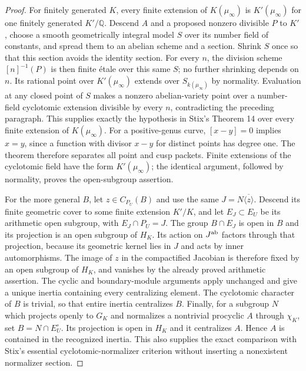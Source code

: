 \begin{proof}
For finitely generated $K$, every finite extension of $K(\mu_\infty)$
is $K'(\mu_\infty)$ for one finitely generated $K'/\mathbb Q$.
Descend $A$ and a proposed nonzero divisible $P$ to $K'$, choose
a smooth geometrically integral model $S$ over its number field of
constants, and spread them to an abelian scheme and a section.
Shrink $S$ once so that this section avoids the identity section.
For every $n$, the division scheme $[n]^{-1}(P)$ is then finite
\'etale over this same $S$; no further shrinking depends on $n$.
Its rational point over $K'(\mu_\infty)$ extends over
$S_{k(\mu_\infty)}$ by normality. Evaluation at any closed point
of $S$ makes a nonzero abelian-variety point over a number-field
cyclotomic extension divisible by every $n$, contradicting the
preceding paragraph. This supplies exactly the hypothesis in
Stix's Theorem 14 over every finite extension of $K(\mu_\infty)$.
For a positive-genus curve, $[x-y]=0$ implies $x=y$, since a
function with divisor $x-y$ for distinct points has degree one.
The theorem therefore separates all point and cusp
packets. Finite extensions of the cyclotomic field have the form
$K'(\mu_\infty)$; the identical argument, followed by normality,
proves the open-subgroup assertion.

For the more general $B$, let $z\in C_{P_U}(B)$ and use the same
$J=N\overline{\langle z\rangle}$. Descend its finite geometric
cover to some finite extension $K'/K$, and let $E_J\subset E_U$
be its arithmetic open subgroup, with $E_J\cap P_U=J$.
The group $B\cap E_J$ is open in $B$ and its projection is an
open subgroup of $H_K$. Its action on $J^{\rm ab}$ factors through
that projection, because its geometric kernel lies in $J$ and
acts by inner automorphisms. The image of $z$ in the compactified
Jacobian is therefore fixed by an open subgroup of $H_K$, and
vanishes by the already proved arithmetic assertion. The cyclic
and boundary-module arguments apply unchanged and give a unique
inertia containing every centralizing element. The cyclotomic
character of $B$ is trivial, so that entire inertia centralizes $B$.
Finally, for a subgroup $N$ which projects openly to $G_K$ and
normalizes a nontrivial procyclic $A$ through $\chi_K$, set
$B=N\cap E_U^{\circ}$. Its projection is open in $H_K$ and it
centralizes $A$. Hence $A$ is contained in the recognized inertia.
This also supplies the exact comparison with Stix's essential
cyclotomic-normalizer criterion without inserting a nonexistent
normalizer section.
\end{proof}




